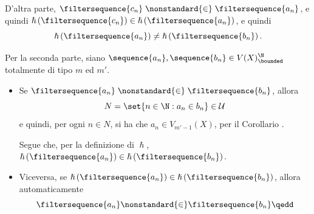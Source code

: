 {\begin{itemize}
        D'altra parte, $ \filtersequence{c_{n}} \mathrel{\nonstandard{\in}}\filtersequence{a_{n}} $, e quindi $ \hslash\left(\filtersequence{c_{n}}\right)\in \hslash\left(\filtersequence{a_{n}}\right) $, e quindi \begin{equation*}
            \hslash\left(\filtersequence{a_{n}}\right) \neq \hslash\left(\filtersequence{b_{n}}\right).
        \end{equation*}
    \end{itemize}

    Per la seconda parte, siano $ \sequence{a_{n} },\sequence{b_{n}} \in V(X)^{\N}_{\bounded} $ totalmente di tipo $ m $ ed $ m' $. \begin{itemize}
        \item Se $ \filtersequence{a_{n}} \mathrel{\nonstandard{\in}} \filtersequence{b_{n}} $, allora \begin{equation*}
            N=\set{n \in \N: a_{n} \in b_{n}} \in \mathcal{U}
        \end{equation*}e quindi, per ogni $ n \in N $, si ha che $ a_{n} \in V_{m'-1}(X) $, per il Corollario . 

        Segue che, per la definizione di $ \hslash $, $ \hslash\left(\filtersequence{a_{n}}\right) \in \hslash\left(\filtersequence{b_{n}}\right)$. 
        \item Viceversa, se $ \hslash\left(\filtersequence{a_{n}}\right) \in \hslash\left(\filtersequence{b_{n}}\right) $, allora automaticamente \begin{equation*}
            \filtersequence{a_{n}} \mathcal{\nonstandard{\in}} \filtersequence{b_{n}}\qedd
        \end{equation*}
    \end{itemize}
} 
